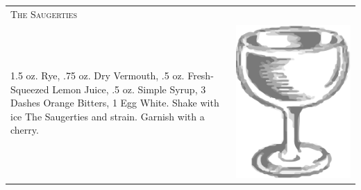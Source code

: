 \documentclass{article}
\begin{document}
\begin{tabular}{p{2in} p{0.5in}}
\multicolumn{2}{p{3in}}{\centering\Huge\textsc{The Saugerties}} \\ 
  \vspace{-0.1in}1.5 oz. Rye, .75 oz. Dry Vermouth, .5 oz. Fresh-Squeezed Lemon Juice, .5 oz. Simple Syrup, 3 Dashes Orange Bitters, 1 Egg White. Shake with ice The Saugerties and strain. Garnish with a cherry. &
  \vspace{-0.1in} \includegraphics{coupe.png}
\end{tabular}
\end{document}
